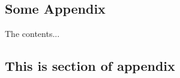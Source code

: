 
\begin{appendices}

\chapter{Some Appendix}
The contents...

\section{This is section of appendix}

\end{appendices}